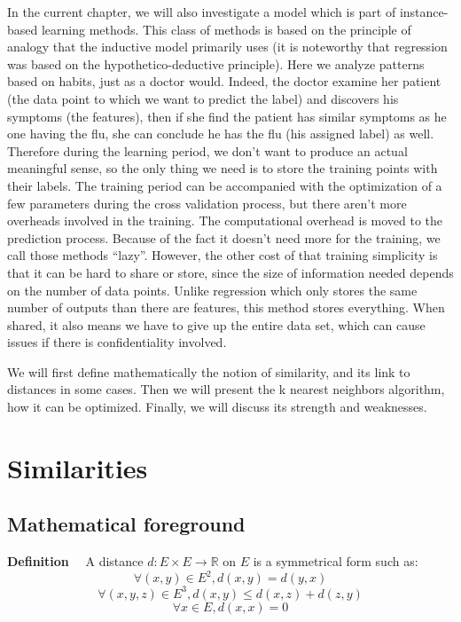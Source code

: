\documentclass[a4paper,12pt]{article}
\begin{document}
	In the current chapter, we will also investigate a model which is part of instance-based learning methods. This class of methods is based on the principle of analogy that the inductive model primarily uses (it is noteworthy that regression was based on the hypothetico-deductive principle). Here we analyze patterns based on habits, just as a doctor would. Indeed, the doctor examine her patient (the data point to which we want to predict the label) and discovers his symptoms (the features), then if she find the patient has similar symptoms as he one having the flu, she can conclude he has the flu (his assigned label) as well. Therefore during the learning period, we don't want to produce an actual meaningful sense, so the only thing we need is to store the training points with their labels. The training period can be accompanied with the optimization of a few parameters during the cross validation process, but there aren't more overheads involved in the training. The computational overhead is moved to the prediction process. Because of the fact it doesn't need more for the training, we call those methods "`lazy"'. However, the other cost of that training simplicity is that it can be hard to share or store, since the size of information needed depends on the number of data points. Unlike regression which only stores the same number of outputs than there are features, this method stores everything. When shared, it also means we have to give up the entire data set, which can cause issues if there is confidentiality involved.
	
	We will first define mathematically the notion of similarity, and its link to distances in some cases. Then we will present the k nearest neighbors algorithm, how it can be optimized. Finally, we will discuss its strength and weaknesses.
	
\section{Similarities}

\subsection{Mathematical foreground}

\textbf{Definition}$\quad$ A distance $d: E\times E \rightarrow \mathbb{R} $ on $E$ is a symmetrical form such as:  
$$ \forall (x,y) \in E^2, d(x,y)=d(y,x) $$
$$ \forall (x,y,z) \in E^3, d(x,y) \leq d(x,z) +d(z,y) $$
$$ \forall x \in E, d(x,x) = 0 $$
\end{document}
